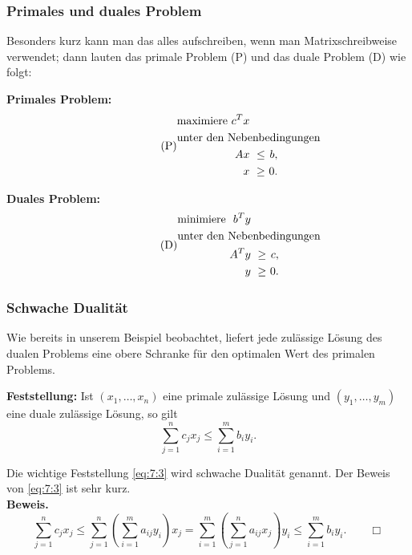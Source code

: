 \documentclass[smaller]{beamer}
\begin{document}
\begin{frame}
\frametitle{Primales und duales Problem}
 Besonders kurz kann man das alles aufschreiben, wenn man \alert{Matrixschreibweise} verwendet; dann lauten das primale Problem (P) und das duale Problem (D) wie folgt: \\ \vspace*{0.2cm}

\textbf{Primales Problem:}
\begin{align}
\tag{P}
\begin{alignedat}{3}
& \text{maximiere } & c^Tx & & \\
& \rlap{unter den Nebenbedingungen} & & \\
&& Ax &\ \leq &\ b, \\
&&  x &\ \geq &\ 0.
\end{alignedat}
\end{align}

\textbf{Duales Problem:}
\begin{align}
\tag{D}
\begin{alignedat}{3}
& \text{minimiere } & b^Ty & & \\
& \rlap{unter den Nebenbedingungen} & & \\
&& A^Ty &\ \geq &\ c, \\
&&    y &\ \geq &\ 0.
\end{alignedat}
\end{align}
\end{frame}

\begin{frame}
\frametitle{Schwache Dualität}
 Wie bereits in unserem Beispiel beobachtet, liefert jede zulässige Lösung des dualen Problems eine \alert{obere Schranke} für den optimalen Wert des primalen Problems. \\ \vspace*{0.2cm}

\textbf{Feststellung:}
Ist $(x_1,\ldots,x_n)$ eine primale zulässige Lösung und $(y_1,\ldots,y_m)$ eine duale zulässige Lösung, so gilt
\begin{equation}
\label{eq:7:3}
\sum\limits_{j=1}^{n}{c_jx_j} \leq \sum\limits_{i=1}^{m}{b_iy_i}.
\end{equation}


Die wichtige Feststellung \eqref{eq:7:3} wird \alert{schwache Dualität} genannt. Der Beweis von \eqref{eq:7:3} ist sehr kurz. \\ \vspace*{0.2cm}
\textbf{Beweis.}
\[
\sum\limits_{j=1}^{n}{c_jx_j} \leq \sum\limits_{j=1}^{n}{\left( \sum\limits_{i=1}^{m}{a_{ij}y_i} \right) x_j}
= \sum\limits_{i=1}^{m}{\left( \sum\limits_{j=1}^{n}{a_{ij}x_j} \right) y_i} \leq \sum\limits_{i=1}^{m}{b_iy_i}. \qquad \Box
\]
\end{frame}
\end{document}
